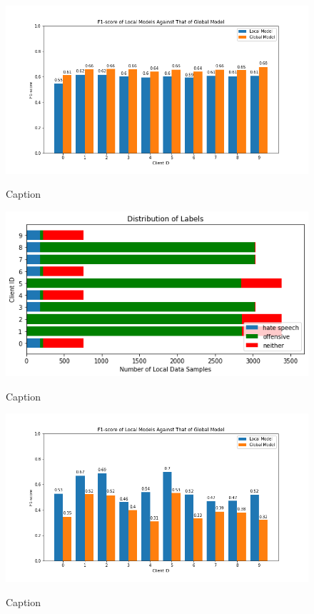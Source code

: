 \documentclass[letterpaper]{article} %
\begin{document}
\begin{figure}[hbt!]
{\includegraphics[width=\columnwidth]{iid-quantity-skew_seed_5performance_of_models_on_client_data_f1score}}
\caption{Caption}
\end{figure}
\begin{figure}[hbt!]
{\includegraphics[width=\columnwidth]{noniid-quantity-based-label-imbalance-2_distribution_of_labels_2}}
\caption{Caption}
\end{figure}
\begin{figure}[hbt!]
{\includegraphics[width=\columnwidth]{noniid-quantity-based-label-imbalance-2_seed_2performance_of_local_models_f1score}}
\caption{Caption}
\end{figure}
\end{document}
